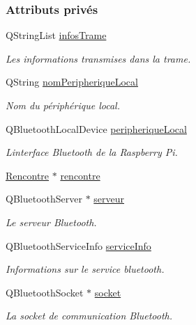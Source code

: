 \subsubsection*{Attributs privés}
\begin{DoxyCompactItemize}
\item 
Q\+String\+List \hyperlink{class_communication_a219fe9a4cd04470241f26f1f6159d721}{infos\+Trame}
\begin{DoxyCompactList}\small\item\em Les informations transmises dans la trame. \end{DoxyCompactList}\item 
Q\+String \hyperlink{class_communication_acfe0b2b569ebf174fcdd766272b89ba8}{nom\+Peripherique\+Local}
\begin{DoxyCompactList}\small\item\em Nom du périphérique local. \end{DoxyCompactList}\item 
Q\+Bluetooth\+Local\+Device \hyperlink{class_communication_a2d643d199169dfe1d258df54d3ee5728}{peripherique\+Local}
\begin{DoxyCompactList}\small\item\em L\textquotesingle{}interface Bluetooth de la Raspberry Pi. \end{DoxyCompactList}\item 
\hyperlink{class_rencontre}{Rencontre} $\ast$ \hyperlink{class_communication_acb471e5da168acc149c5e4e90d8b601c}{rencontre}
\item 
Q\+Bluetooth\+Server $\ast$ \hyperlink{class_communication_a6384747297d6efa9e8fd2fc79ed0c269}{serveur}
\begin{DoxyCompactList}\small\item\em Le serveur Bluetooth. \end{DoxyCompactList}\item 
Q\+Bluetooth\+Service\+Info \hyperlink{class_communication_aa7f9ee5e5d90336a56857ebc229e4274}{service\+Info}
\begin{DoxyCompactList}\small\item\em Informations sur le service bluetooth. \end{DoxyCompactList}\item 
Q\+Bluetooth\+Socket $\ast$ \hyperlink{class_communication_aa4ddc3151b305db0135d5826384645cc}{socket}
\begin{DoxyCompactList}\small\item\em La socket de communication Bluetooth. \end{DoxyCompactList}\item 

\end{DoxyCompactItemize}

